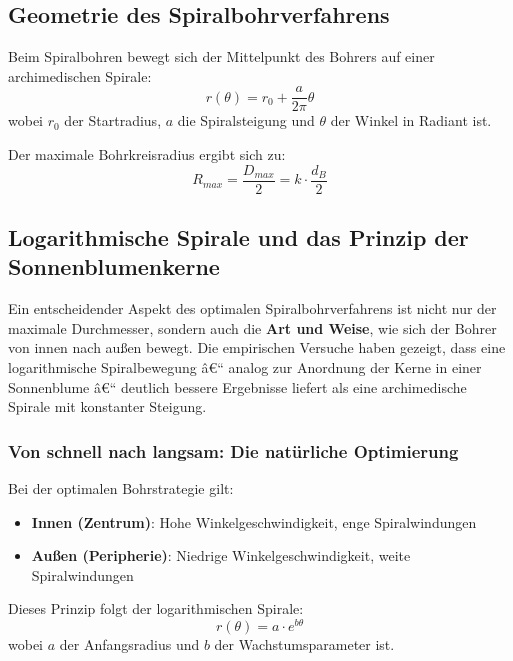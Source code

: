 ﻿\documentclass[12pt,a4paper]{article}
\begin{document}
\subsection{Geometrie des Spiralbohrverfahrens}

Beim Spiralbohren bewegt sich der Mittelpunkt des Bohrers auf einer archimedischen Spirale:
\begin{equation}
	r(\theta) = r_0 + \frac{a}{2\pi}\theta
\end{equation}
wobei $r_0$ der Startradius, $a$ die Spiralsteigung und $\theta$ der Winkel in Radiant ist.

Der maximale Bohrkreisradius ergibt sich zu:
\begin{equation}
	R_{max} = \frac{D_{max}}{2} = k \cdot \frac{d_B}{2}
\end{equation}

\subsection{Logarithmische Spirale und das Prinzip der Sonnenblumenkerne}

Ein entscheidender Aspekt des optimalen Spiralbohrverfahrens ist nicht nur der maximale Durchmesser, sondern auch die \textbf{Art und Weise}, wie sich der Bohrer von innen nach außen bewegt. Die empirischen Versuche haben gezeigt, dass eine logarithmische Spiralbewegung â€“ analog zur Anordnung der Kerne in einer Sonnenblume â€“ deutlich bessere Ergebnisse liefert als eine archimedische Spirale mit konstanter Steigung.

\subsubsection{Von schnell nach langsam: Die natürliche Optimierung}

Bei der optimalen Bohrstrategie gilt:
\begin{itemize}
	\item \textbf{Innen (Zentrum)}: Hohe Winkelgeschwindigkeit, enge Spiralwindungen
	\item \textbf{Außen (Peripherie)}: Niedrige Winkelgeschwindigkeit, weite Spiralwindungen
\end{itemize}

Dieses Prinzip folgt der logarithmischen Spirale:
\begin{equation}
	r(\theta) = a \cdot e^{b\theta}
\end{equation}
wobei $a$ der Anfangsradius und $b$ der Wachstumsparameter ist.
\end{document}
